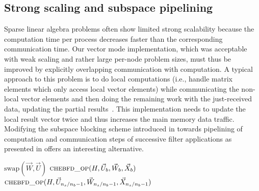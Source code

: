 \documentclass[letterpaper]{llncs}
\begin{document}
\subsection{Strong scaling and subspace pipelining}\label{sec:sspipe}

Sparse linear algebra problems often show
limited strong scalability because the computation time per
process decreases faster than the corresponding communication
time. Our vector mode implementation, which was acceptable with
weak scaling and rather large per-node problem sizes, must thus
be improved by explicitly overlapping communication with
computation. A typical approach to this problem is
to do local computations (i.e., handle matrix elements which only
access local vector elements) while communicating the non-local vector
elements and then doing the remaining work with the just-received data,
updating the partial results~\cite{Kreutzer2012}. This implementation needs
to update the local result vector twice and thus increases the
main memory data traffic. Modifying the subspace blocking scheme
introduced in  towards pipelining of
computation and communication steps of successive filter applications
as presented in  offers an interesting
alternative.
\begin{algorithm}[tb]
    \caption{Blocked application of the ChebFD polynomial filter with pipelined communication and computation (``pipelined mode'').}
    \begin{algorithmic}[1]  
            \State $\mbox{swap} ( \vec W ,  \vec U )$
            \State {}
            \State {}
                \State {}
                \State $\Call{chebfd\_op}{H,\vec U_b, \vec W_b, \vec X_b}$
                \State {}
            \EndFor
            \State $\Call{chebfd\_op}{H,\vec U_{n_s/n_b-1}, \vec W_{n_s/n_b-1}, \vec X_{n_s/n_b-1}}$
        \EndFor
    \end{algorithmic}
    \label{alg:chebfd_dist_pipe}
\end{algorithm}
\end{document}
